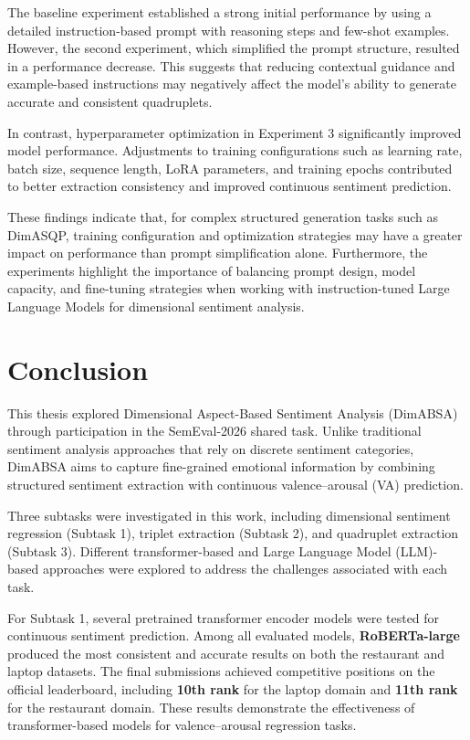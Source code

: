 \documentclass{article}
\begin{document}
The baseline experiment established a strong initial performance by using a detailed instruction-based prompt with reasoning steps and few-shot examples. However, the second experiment, which simplified the prompt structure, resulted in a performance decrease. This suggests that reducing contextual guidance and example-based instructions may negatively affect the model’s ability to generate accurate and consistent quadruplets.

In contrast, hyperparameter optimization in Experiment 3 significantly improved model performance. Adjustments to training configurations such as learning rate, batch size, sequence length, LoRA parameters, and training epochs contributed to better extraction consistency and improved continuous sentiment prediction.

These findings indicate that, for complex structured generation tasks such as DimASQP, training configuration and optimization strategies may have a greater impact on performance than prompt simplification alone. Furthermore, the experiments highlight the importance of balancing prompt design, model capacity, and fine-tuning strategies when working with instruction-tuned Large Language Models for dimensional sentiment analysis.


\section{Conclusion}
\label{sec:conclusion}

This thesis explored Dimensional Aspect-Based Sentiment Analysis (DimABSA) through participation in the SemEval-2026 shared task. Unlike traditional sentiment analysis approaches that rely on discrete sentiment categories, DimABSA aims to capture fine-grained emotional information by combining structured sentiment extraction with continuous valence–arousal (VA) prediction.

Three subtasks were investigated in this work, including dimensional sentiment regression (Subtask 1), triplet extraction (Subtask 2), and quadruplet extraction (Subtask 3). Different transformer-based and Large Language Model (LLM)-based approaches were explored to address the challenges associated with each task.

For Subtask 1, several pretrained transformer encoder models were tested for continuous sentiment prediction. Among all evaluated models, \textbf{RoBERTa-large} produced the most consistent and accurate results on both the restaurant and laptop datasets. The final submissions achieved competitive positions on the official leaderboard, including \textbf{10th rank} for the laptop domain and \textbf{11th rank} for the restaurant domain. These results demonstrate the effectiveness of transformer-based models for valence–arousal regression tasks.
\end{document}
